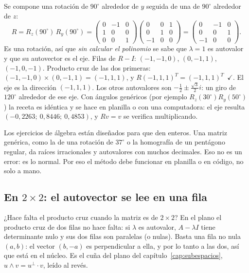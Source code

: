 Se compone una rotación de \(90^\circ\) alrededor de \(y\) seguida de una de \(90^\circ\)
alrededor de \(z\):
\[
  R=R_z(90^\circ)\,R_y(90^\circ)=
  \begin{pmatrix}0&-1&0\\1&0&0\\0&0&1\end{pmatrix}
  \begin{pmatrix}0&0&1\\0&1&0\\-1&0&0\end{pmatrix}
  =\begin{pmatrix}0&-1&0\\0&0&1\\-1&0&0\end{pmatrix}.
\]
Es una rotación, así que \emph{sin calcular el polinomio} se sabe que \(\lambda=1\) es
autovalor y que su autovector es el eje. Filas de \(R-I\): \((-1,-1,0)\), \((0,-1,1)\),
\((-1,0,-1)\). Producto cruz de las dos primeras: \((-1,-1,0)\times(0,-1,1)=(-1,1,1)\), y
\(R(-1,1,1)^T=(-1,1,1)^T\)~\(\checkmark\).
El eje es la dirección \((-1,1,1)\). Los otros autovalores son \(-\frac12\pm\frac{\sqrt3}2 i\):
un giro de \(120^\circ\) alrededor de ese eje. Con ángulos genéricos (por ejemplo
\(R_z(30^\circ)R_y(50^\circ)\)) la receta es idéntica y se hace en planilla o con una computadora: el
eje resulta \((-0{,}2263;\ 0{,}8446;\ 0{,}4853)\), y \(Rv=v\) se verifica multiplicando.

\begin{atencion}
Los ejercicios de álgebra están diseñados para que den enteros. Una matriz genérica, como
la de una rotación de \(37^\circ\) o la homografía de un pentágono regular, da raíces
irracionales y autovalores con muchos decimales. Eso no es un error: es lo normal. Por eso
el método debe funcionar en planilla o en código, no solo a mano.
\end{atencion}

\subsection{En \texorpdfstring{$2\times2$}{2x2}: el autovector se lee en una fila}\label{sec:autovec-2x2}

¿Hace falta el producto cruz cuando la matriz es de \(2\times2\)? En el plano el producto cruz de dos filas no hace falta: si \(\lambda\) es autovalor,
\(A-\lambda I\) tiene determinante nulo y sus dos filas son paralelas (o nulas). Basta una
fila no nula \((a,b)\): el vector \((b,-a)\) es perpendicular a ella, y por lo tanto a las
dos, así que está en el núcleo. Es el cuña del plano del capítulo~\ref{cap:subespacios},
\(u\wedge v=u^\perp\cdot v\), leído al revés.

